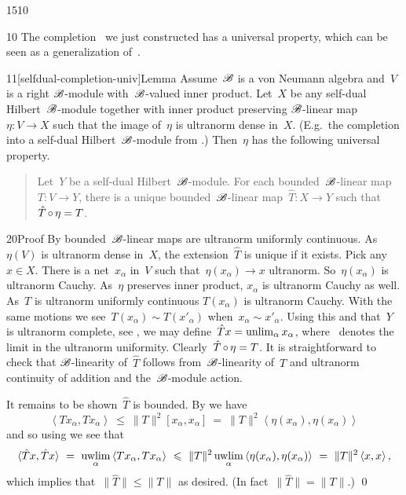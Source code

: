 \begin{parsec}{1510}%
\begin{point}{10}%
The completion~ we just constructed
    has a universal property,
    which can be seen as a generalization of~\cite[prop.~3.6]{paschke}.
\end{point}
\begin{point}{11}[selfdual-completion-univ]{Lemma}%
Assume~$\mathscr{B}$ is a von Neumann algebra
    and~$V$ is a right $\mathscr{B}$-module
    with~$\mathscr{B}$-valued inner product.
Let~$X$ be any self-dual Hilbert~$\mathscr{B}$-module
    together with inner product preserving
    $\mathscr{B}$-linear map~$\eta\colon V \to X$
    such that the image of~$\eta$ is ultranorm dense in~$X$.
(E.g.~the completion into a self-dual Hilbert~$\mathscr{B}$-module
from .)
Then~$\eta$ has the following universal property.
\begin{quote}
Let~$Y$ be a self-dual Hilbert~$\mathscr{B}$-module.
For each bounded~$\mathscr{B}$-linear
    map~$T\colon V \to Y$,
    there is a unique bounded~$\mathscr{B}$-linear
    map~$\hat{T} \colon X \to Y$
    such that~$\hat{T} \mathop{\circ} \eta = T$.
\end{quote}
    \spacingfix{}
\begin{point}{20}{Proof}%
By  bounded~$\mathscr{B}$-linear
    maps are ultranorm uniformly continuous.
As~$\eta(V)$ is ultranorm dense in~$X$,
    the extension~$\hat{T}$ is unique if it exists.
Pick any~$x \in X$.
There is a net~$x_\alpha$ in~$V$ such
    that~$\eta(x_\alpha) \to x$ ultranorm.
So~$\eta(x_\alpha)$ is ultranorm Cauchy.
As~$\eta$ preserves inner product,
    $x_\alpha$ is ultranorm Cauchy as well.
As~$T$ is ultranorm uniformly continuous
    $T(x_\alpha)$ is ultranorm Cauchy.
With the same motions we see~$T(x_\alpha) \sim T(x'_\alpha)$
    when~$x_\alpha \sim x'_\alpha$.
Using this and that~$Y$ is ultranorm complete, see ,
    we may define~$\hat{T} x = \unlim_\alpha x_\alpha$,
    where~\Define{$\unlim$} denotes the limit in the ultranorm uniformity.
Clearly~$\hat{T}\mathop{\circ}\eta=T$.
It is straightforward to check
    that $\mathscr{B}$-linearity
    of~$\hat{T}$
    follows from~$\mathscr{B}$-linearity of~$T$
    and ultranorm continuity of addition and
        the~$\mathscr{B}$-module action.

It remains to be shown~$\hat{T}$ is bounded.
By   we have
\begin{equation*}
\left<T x_\alpha,T x_\alpha\right>
\ \leq\  \| T\|^2 [x_\alpha,x_\alpha]
\ =\  \|T\|^2 \left<\eta(x_\alpha),\eta(x_\alpha)\right>
\end{equation*}
and so using  we see that
\begin{equation*}
\langle\hat{T} x, \hat{T} x\rangle \ =\ 
\uwlim_\alpha \left<T x_\alpha, T x_\alpha\right>
            \ \leq \ \|T\|^2 \uwlim_\alpha \left<\eta(x_\alpha), \eta(x_\alpha)\right>
            \ =\  \|T\|^2 \left<x,x\right>,
\end{equation*}
which implies that~$\|\hat{T}\| \leq \|T\|$ as desired.
(In fact~$\|\hat{T}\| = \|T\|$.) \qed
\end{point}
\end{point}
\end{parsec}
